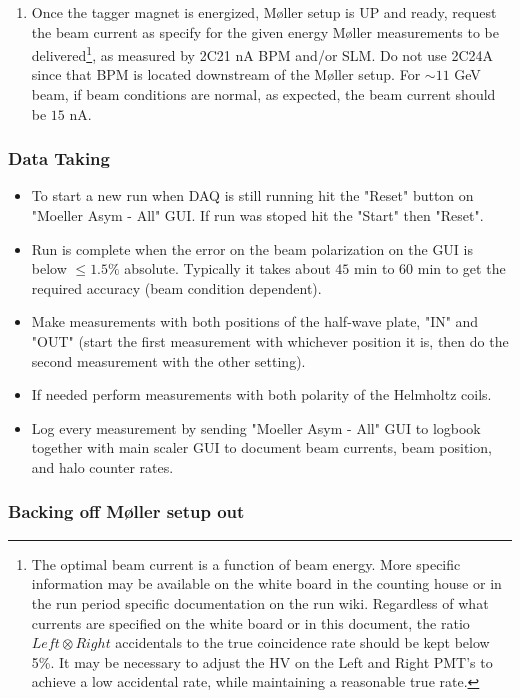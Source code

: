 \begin{enumerate}
\begin{enumerate}
\end{enumerate}
%

\item Once the tagger magnet is energized, M{\o}ller setup is UP and ready, request the beam current as specify for the given energy M{\o}ller measurements to be delivered\footnote{The optimal beam current is a function of beam energy.
More specific information may be available on the white board in the
counting house or in the run period specific documentation on the run wiki. Regardless
of what currents are specified on the white board or in this document,
the ratio $Left\otimes Right$ accidentals to the true coincidence
rate should be kept below 5\%. It may be necessary to adjust the
HV on the Left and Right PMT's to achieve a low accidental rate, while
maintaining a reasonable true rate.}, 
as measured by 2C21 nA BPM and/or SLM. Do
not use 2C24A since that BPM is located downstream of the M{\o}ller setup. For $\sim 11$ GeV beam, if beam conditions are normal, as expected, the beam current should be $15$ nA. 

\end{enumerate}

\subsubsection{Data Taking}
\indent
\begin{itemize}
\item 
To start a new run when DAQ is still running hit the "Reset" button on "Moeller Asym - All" GUI. If run was stoped hit the "Start" then "Reset". 
\item Run is complete when the error on the beam polarization on the GUI is below $\le 1.5\%$ absolute. Typically it takes about $45$ min to $60$ min to get the required accuracy (beam condition dependent). 
\item Make measurements with both positions of the half-wave plate,  "IN" and "OUT" (start the first measurement with whichever position it is, then do the second measurement with the other setting). 
\item If needed perform measurements with both polarity of the Helmholtz coils. 
\item Log every measurement by sending "Moeller Asym - All" GUI to logbook together with main scaler GUI to document beam currents, beam position, and halo counter rates. 
\end{itemize}

\subsubsection{Backing off M{\o}ller setup out\label{moller cblose out}}

